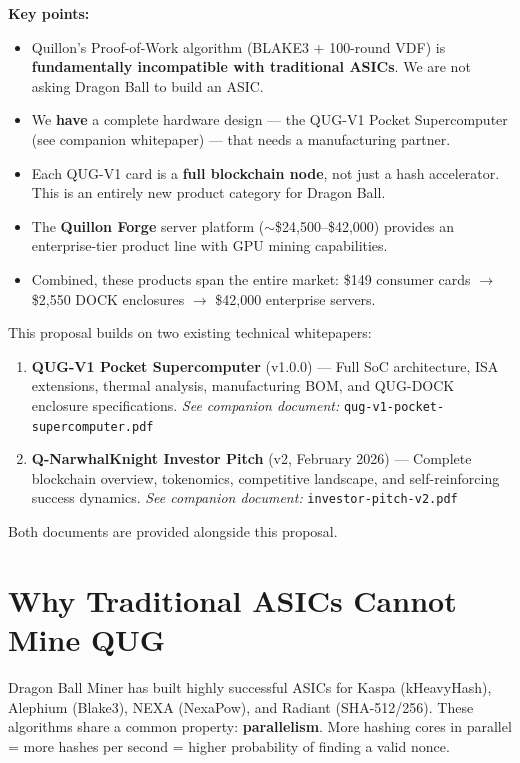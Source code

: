 \documentclass[11pt,a4paper]{article}
\begin{document}
\textbf{Key points:}
\begin{itemize}[leftmargin=1.5em]
    \item Quillon's Proof-of-Work algorithm (BLAKE3 + 100-round VDF) is \textbf{fundamentally incompatible with traditional ASICs}. We are not asking Dragon Ball to build an ASIC.
    \item We \textbf{have} a complete hardware design --- the QUG-V1 Pocket Supercomputer (see companion whitepaper) --- that needs a manufacturing partner.
    \item Each QUG-V1 card is a \textbf{full blockchain node}, not just a hash accelerator. This is an entirely new product category for Dragon Ball.
    \item The \textbf{Quillon Forge} server platform ($\sim$\$24,500--\$42,000) provides an enterprise-tier product line with GPU mining capabilities.
    \item Combined, these products span the entire market: \$149 consumer cards $\to$ \$2,550 DOCK enclosures $\to$ \$42,000 enterprise servers.
\end{itemize}

\begin{keyinsight}
This proposal builds on two existing technical whitepapers:
\begin{enumerate}
    \item \textbf{QUG-V1 Pocket Supercomputer} (v1.0.0) --- Full SoC architecture, ISA extensions, thermal analysis, manufacturing BOM, and QUG-DOCK enclosure specifications. \textit{See companion document:} \texttt{qug-v1-pocket-supercomputer.pdf}
    \item \textbf{Q-NarwhalKnight Investor Pitch} (v2, February 2026) --- Complete blockchain overview, tokenomics, competitive landscape, and self-reinforcing success dynamics. \textit{See companion document:} \texttt{investor-pitch-v2.pdf}
\end{enumerate}
Both documents are provided alongside this proposal.
\end{keyinsight}


\section{Why Traditional ASICs Cannot Mine QUG}

Dragon Ball Miner has built highly successful ASICs for Kaspa (kHeavyHash), Alephium (Blake3), NEXA (NexaPow), and Radiant (SHA-512/256). These algorithms share a common property: \textbf{parallelism}. More hashing cores in parallel = more hashes per second = higher probability of finding a valid nonce.
\end{document}
